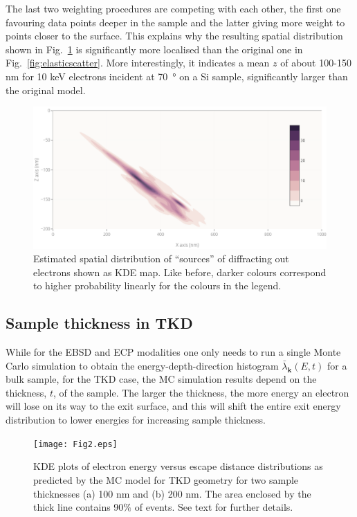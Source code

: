 The last two weighting procedures are competing with each other, the first one favouring data points deeper in the sample and the latter giving more weight to points closer to the surface. This explains why the resulting spatial distribution shown in Fig.~\ref{fig:last_weight} is significantly more localised than the original one in Fig.~\ref{fig:elasticscatter}. More interestingly, it indicates a mean $z$ of about 100-150 nm for 10 keV electrons incident at \SI{70}{\degree} on a Si sample, significantly larger than the original model.  

\begin{figure}[ht]
\centering
\includegraphics[width=5.8in]{Figures/last_weight.png}
\caption[Estimated spatial distribution of diffraction out ``sources''.]{Estimated spatial distribution of ``sources'' of diffracting out electrons shown as KDE map. Like before, darker colours correspond to higher probability linearly for the colours in the legend.  }
\label{fig:last_weight}
\end{figure}




%
\subsection{Sample thickness in TKD}
\label{sec:TKDthickness}
While for the EBSD and ECP modalities one only needs to run a single Monte Carlo simulation to obtain the energy-depth-direction histogram $\bar{\lambda}_{\mathbf{k}}(E,t)$ for a bulk sample, for the TKD case, the MC simulation results depend on the thickness, $t$, of the sample.
The larger the thickness, the more energy an electron will lose on its way to the exit surface, and this will shift the entire exit energy distribution to lower energies for increasing sample thickness. 




\begin{figure}[ht]
\centering
\texttt{[image: Fig2.eps]}%
\caption[KDE plots of electron energy versus escape distance distributions]{KDE plots of electron energy versus escape distance distributions as predicted by the MC model for TKD geometry for two sample thicknesses (a) 100 nm and (b) 200 nm. The area enclosed by the thick line contains 90$\%$ of events. See text for further details. }
\label{fig:E_z_KDE}
\end{figure}

